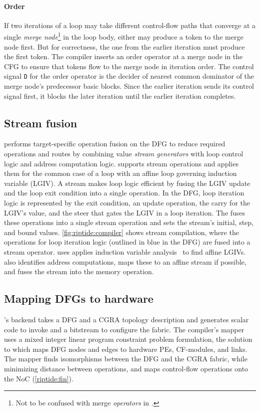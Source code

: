 \paragraph{Order}
If two iterations of a loop may take different control-flow
paths that converge at a single {\em merge node}\footnote{Not to be confused with merge \emph{operators} in \riptide.} in the loop body, either may
produce a token to the merge node first.
But for correctness, the one from the
earlier iteration must produce the first token.
%
The compiler inserts an order operator at a merge node in the CFG to ensure that 
tokens flow to the merge node in iteration order.
%
The control signal {\tt D} for the order operator is the decider of
nearest common dominator of the merge node's predecessor basic blocks.
%
%
Since the earlier iteration sends its control signal first, it blocks the later
iteration %
until the earlier iteration completes.
%

\subsection{Stream fusion}

\riptidecomp performs target-specific operation fusion on the DFG to
reduce required operations and routes by combining value {\em stream generators} with loop
control logic and address computation logic.
%
\riptide supports stream operations and applies them for the common case 
of a loop with an affine loop governing induction variable (LGIV).
%
A stream makes loop logic efficient by fusing the LGIV update and the loop
exit condition into a single operation.
%
In the DFG, loop iteration logic is represented by the exit condition, an
update operation, the carry for the LGIV's value, and the steer that
gates the LGIV in a loop iteration.
%
The \mend fuses these operations into a single stream operation and sets
the stream's initial, step, and bound values.
%
\autoref{fig:riptide:compiler} shows stream compilation, where
the operations for loop iteration logic (outlined in blue in the 
DFG) are fused into a stream operator.
%
\riptidecomp uses applies induction variable analysis~\cite{dragon,zima-scev} to 
find affine LGIVs.
%
\riptidecomp also identifies address computations, maps these to an affine
stream if possible, and fuses the stream into the memory operation.
%

\subsection{Mapping DFGs to hardware}
\riptidecomp's backend takes a DFG and a CGRA topology description and generates
scalar code to invoke \riptide and a bitstream to configure the \riptide fabric.
% 
The compiler's mapper uses a mixed integer linear program constraint problem formulation, the
solution to which maps DFG nodes and edges to hardware PEs, CF-modules, and
links.
% 
The mapper finds isomorphisms between the DFG and the CGRA fabric, while
minimizing distance between operations, and maps control-flow operations onto
the NoC (\autoref{riptide:fin}).
%